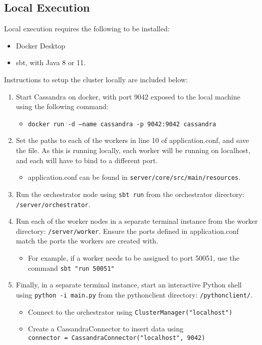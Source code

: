 \subsection{Local Execution}
Local execution requires the following to be installed:
\begin{itemize}
	\item Docker Desktop
	\item sbt, with Java 8 or 11.
\end{itemize}


Instructions to setup the cluster locally are included below:

\begin{enumerate}
	\item Start Cassandra on docker, with port 9042 exposed to the local machine using the following command:
	\begin{itemize}
		\item \texttt{docker run -d --name cassandra -p 9042:9042 cassandra}
	\end{itemize}
	\item Set the paths to each of the workers in line 10 of application.conf, and save the file. As this is running locally, each worker will be running on localhost, and each will have to bind to a different port.
	\begin{itemize}
		\item application.conf can be found in \texttt{server/core/src/main/resources}.
	\end{itemize}
	\item Run the orchestrator node using \texttt{sbt run} from the orchestrator directory: \texttt{/server/orchestrator}.
	\item Run each of the worker nodes in a separate terminal instance from the worker directory: \texttt{/server/worker}. Ensure the ports defined in application.conf match the ports the workers are created with.
	\begin{itemize}
		\item For example, if a worker needs to be assigned to port 50051, use the command \texttt{sbt "run 50051"}
	\end{itemize}
	\item Finally, in a separate terminal instance, start an interactive Python shell using \texttt{python -i main.py} from the python\textunderscore client directory: \texttt{/python\textunderscore client/}.
	\begin{itemize}
		\item Connect to the orchestrator using \texttt{ClusterManager("localhost")}
		\item Create a CassandraConnector to insert data using \\ \texttt{connector = CassandraConnector("localhost", 9042)}
	\end{itemize}
\end{enumerate}

